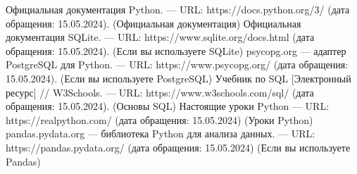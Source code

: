 \begin{thebibliography}{9}
	 Официальная документация Python. — URL: https://docs.python.org/3/ (дата обращения: 15.05.2024). (Официальная документация)
	 Официальная документация SQLite. — URL: https://www.sqlite.org/docs.html (дата обращения: 15.05.2024). (Если вы используете SQLite)
	 psycopg.org — адаптер PostgreSQL для Python. — URL: https://www.psycopg.org/ (дата обращения: 15.05.2024). (Если вы используете PostgreSQL)
	 Учебник по SQL [Электронный ресурс] // W3Schools. — URL: https://www.w3schools.com/sql/ (дата обращения: 15.05.2024). (Основы SQL)
	 Настоящие уроки Python — URL: https://realpython.com/ (дата обращения: 15.05.2024) (Уроки Python)
	pandas.pydata.org — библиотека Python для анализа данных. — URL: https://pandas.pydata.org/ (дата обращения: 15.05.2024) (Если вы используете Pandas)
\end{thebibliography}
